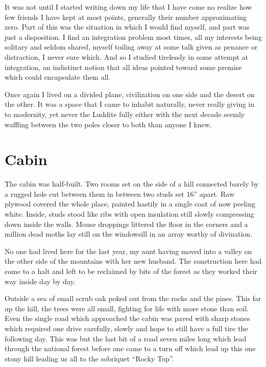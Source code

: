 \documentclass[ebook, 10pt, openright, onecolumn]{memoir}
\newlength{\drop}
\begin{document}
It was not until I started writing down my life that I have come no realize how
few friends I have kept at most points, generally their number approximating
zero.  Part of this was the situation in which I would find myself, and part was
just a disposition.  I find an integration problem most times, all my interests
being solitary and seldom shared, myself toiling away at some talk given as
penance or distraction, I never sure which.  And so I studied tirelessly in some
attempt at integration, an indistinct notion that all ideas pointed toward some
premise which could encapsulate them all. 

Once again I lived on a divided plane, civilization on one side and the desert
on the other.  It was a space that I came to inhabit naturally, never really
giving in to modernity, yet never the Luddite fully either with the next decade
seemly waffling between the two poles closer to both than anyone I knew.  



\chapter{Cabin}
\label{cha:cabin}

The cabin was half-built.  Two rooms set on the side of a hill connected barely
by a rugged hole cut between them in between two studs set 16'' apart.  Raw
plywood covered the whole place, painted hastily in a single coat of now peeling
white.  Inside, studs stood like ribs with open insulation still slowly
compressing down inside the walls.  Mouse droppings littered the floor in the
corners and a million dead moths lay still on the windowsill in an array
worthy of divination.

No one had lived here for the last year, my aunt having moved into a valley on
the other side of the mountains with her new husband.  The construction here had
come to a halt and left to be reclaimed by bits of the forest as they worked
their way inside day by day.  

Outside a sea of small scrub oak poked out from the rocks and the pines.  This
far up the hill, the trees were all small, fighting for life with more stone
than soil.  Even the single road which approached the cabin was paved with sharp
stones which required one drive carefully, slowly and hope to still have a full
tire the following day. This was but the last bit of a road seven miles long
which lead through the national forest before one came to a turn off which lead
up this one stony hill leading us all to the sobriquet ``Rocky Top''.
\end{document}
